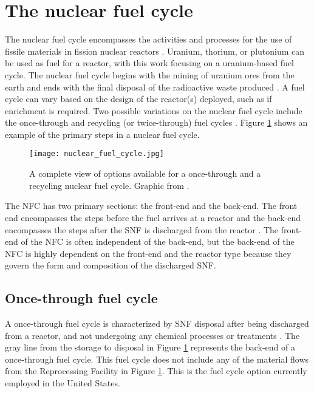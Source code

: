 %
%
%
\section{The nuclear fuel cycle}
The nuclear fuel cycle encompasses the activities and processes 
for the use of fissile materials in fission nuclear reactors \cite{tsoulfanidis_nuclear_2013}. 
Uranium, thorium, or plutonium can be used as 
fuel for a reactor, with  this work focusing on a uranium-based 
fuel cycle. The nuclear fuel cycle begins with the mining of uranium ores 
from the earth and ends with the final disposal of the radioactive 
waste produced 
\cite{tsoulfanidis_nuclear_2013}. A fuel cycle can vary based on the
design of the reactor(s) deployed, such as if enrichment is required.  
Two possible variations on the nuclear fuel cycle 
include the once-through and recycling (or twice-through) fuel cycles 
\cite{tsoulfanidis_nuclear_2013}. Figure \ref{fig:fuel_cycle} shows 
an example of the primary steps in a nuclear fuel cycle. 

\begin{figure}
    \centering
    \texttt{[image: nuclear\_fuel\_cycle.jpg]}
    \caption{A complete view of options available for a once-through and 
    a recycling nuclear 
    fuel cycle. Graphic from \protect\cite{noauthor_stages_2020}.}
    \label{fig:fuel_cycle}
\end{figure}

The \gls{NFC} has two primary sections: the front-end and 
the back-end. 
The front end encompasses the steps before the fuel arrives at a reactor 
and the back-end encompasses the steps after the \gls{SNF} is discharged 
from the reactor \cite{rodriguez-penalonga_review_2017}. The front-end of 
the \gls{NFC} is often independent of the back-end, but the back-end 
of the \gls{NFC} is highly dependent on the front-end and the reactor 
type because they govern the form and composition of the discharged 
\gls{SNF}. 

\subsection{Once-through fuel cycle}
A once-through fuel cycle is characterized by \gls{SNF} disposal
after being discharged from a reactor, and not undergoing any chemical processes 
or treatments \cite{rodriguez-penalonga_review_2017}. The gray line from 
the storage to disposal in Figure \ref{fig:fuel_cycle} represents 
the back-end of a once-through fuel cycle. This fuel cycle does 
not include any of the material flows from the Reprocessing Facility in 
Figure \ref{fig:fuel_cycle}.
This is the fuel cycle option currently employed in the 
United States. 

